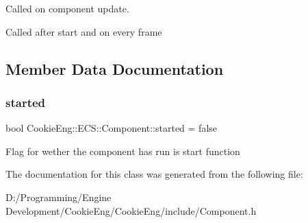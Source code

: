 Called on component update. 

Called after start and on every frame 

\subsection{Member Data Documentation}
\mbox{\label{class_cookie_eng_1_1_e_c_s_1_1_component_aa7129172e0881ed80dbc6256570ad998}} 
\subsubsection{\texorpdfstring{started}{started}}
{\footnotesize\ttfamily bool Cookie\+Eng\+::\+E\+C\+S\+::\+Component\+::started = false}

Flag for wether the component has run is start function 

The documentation for this class was generated from the following file\+:\begin{DoxyCompactItemize}
\item 
D\+:/\+Programming/\+Engine Development/\+Cookie\+Eng/\+Cookie\+Eng/include/Component.\+h\end{DoxyCompactItemize}
